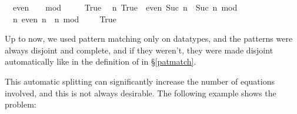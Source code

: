 \begin{isabellebody}
\begin{isamarkuptxt}
  \begin{isabelle}%
\ {}{\isachardot}\ even\ {}\ {\isacharequal}\ {\isacharparenleft}{}\ mod\ {}\ {\isacharequal}\ {}{\isacharparenright}\isanewline
\ {}{\isachardot}\ True\isanewline
\ {}{\isachardot}\ {\isasymAnd}n{\isachardot}\ True\ {\isasymLongrightarrow}\ even\ {\isacharparenleft}Suc\ n{\isacharparenright}\ {\isacharequal}\ {\isacharparenleft}Suc\ n\ mod\ {}\ {\isacharequal}\ {}{\isacharparenright}\isanewline
\ {}{\isachardot}\ {\isasymAnd}n{\isachardot}\ even\ n\ {\isacharequal}\ {\isacharparenleft}n\ mod\ {}\ {\isacharequal}\ {}{\isacharparenright}\ {\isasymLongrightarrow}\ True%
\end{isabelle}%
\end{isamarkuptxt}%
\isamarkuptrue%
\isamarkupfalse%
%
\endisatagproof
{\isafoldproof}%
%
\isadelimproof
%
\endisadelimproof
%
\isamarkuptrue%
%
\begin{isamarkuptext}%
\label{genpats}%
\end{isamarkuptext}%
\isamarkuptrue%
%
\isamarkuptrue%
%
\begin{isamarkuptext}%
Up to now, we used pattern matching only on datatypes, and the
  patterns were always disjoint and complete, and if they weren't,
  they were made disjoint automatically like in the definition of
   in \S\ref{patmatch}.

  This automatic splitting can significantly increase the number of
  equations involved, and this is not always desirable. The following
  example shows the problem:
  

\end{isamarkuptext}
\end{isabellebody}
